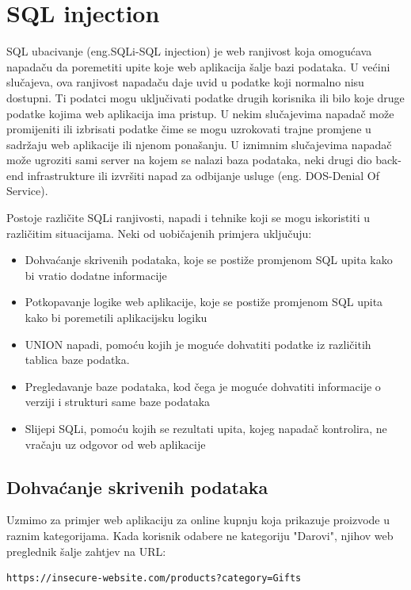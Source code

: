 \documentclass[12pt, oneside, onecolumn]{book}
\begin{document}
{\section{SQL injection}
SQL ubacivanje (eng.SQLi-SQL injection) je web ranjivost koja omogućava napadaču da poremetiti upite koje web aplikacija šalje bazi podataka. U većini slučajeva, ova ranjivost napadaču daje uvid u podatke koji normalno nisu dostupni. Ti podatci mogu uključivati podatke drugih korisnika ili bilo koje druge podatke kojima web aplikacija ima pristup. U nekim slučajevima napadač može promijeniti ili izbrisati podatke čime se mogu uzrokovati trajne promjene u sadržaju web aplikacije ili njenom ponašanju. U iznimnim slučajevima napadač može ugroziti sami server na kojem se nalazi baza podataka,  neki drugi dio back-end infrastrukture ili izvršiti napad za odbijanje usluge (eng. DOS-Denial Of Service).

\pagebreak

Postoje različite SQLi ranjivosti, napadi i tehnike koji se mogu iskoristiti u različitim situacijama. Neki od uobičajenih primjera uključuju: \cite{sitesqli}

\begin{itemize}
\item Dohvaćanje skrivenih podataka, koje se postiže promjenom SQL upita kako bi vratio dodatne informacije
\item Potkopavanje logike web aplikacije, koje se postiže promjenom SQL upita kako bi poremetili aplikacijsku logiku
\item UNION napadi, pomoću kojih je moguće dohvatiti podatke iz različitih tablica baze podatka.
\item Pregledavanje baze podataka, kod čega je moguće dohvatiti informacije o verziji i strukturi same baze podataka
\item Slijepi SQLi, pomoću kojih se rezultati upita, kojeg napadač kontrolira, ne vračaju uz odgovor od web aplikacije
\end{itemize}

\subsection{Dohvaćanje skrivenih podataka}
Uzmimo za primjer web aplikaciju za online kupnju koja prikazuje proizvode u raznim kategorijama. Kada korisnik odabere ne kategoriju "Darovi", njihov web preglednik šalje zahtjev na URL:

\begin{verbatim}
https://insecure-website.com/products?category=Gifts
\end{verbatim}

}
\end{document}
